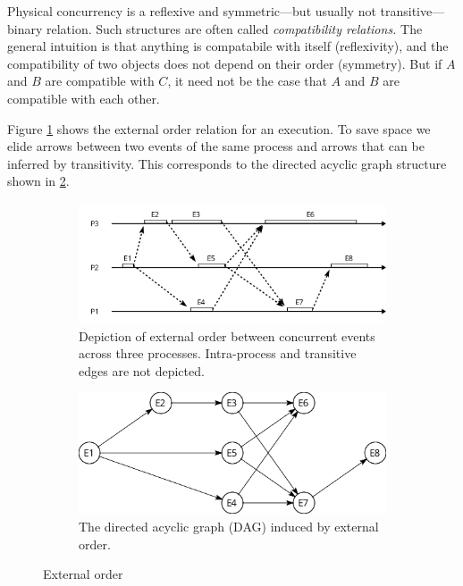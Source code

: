 \documentclass[]             %
{NASA}                       %
\theoremstyle{definition}
\begin{document}
Physical concurrency is a reflexive and symmetric---but usually not
transitive--- binary relation. Such structures are often called
\emph{compatibility relations.} The general intuition is that anything
is compatabile with itself (reflexivity), and the compatibility of two
objects does not depend on their order (symmetry). But if \(A\) and
\(B\) are compatible with \(C\), it need not be the case that \(A\) and
\(B\) are compatible with each other.

Figure \ref{fig:externalorderexec} shows the external order relation for
an execution. To save space we elide arrows between two events of the
same process and arrows that can be inferred by transitivity. This
corresponds to the directed acyclic graph structure shown in
\ref{fig:externalorderdag}.

\begin{figure}
     \begin{subfigure}[a]{1\textwidth}
         \center
         \includegraphics[scale=0.4]{images/externalorder.png}
         \caption{Depiction of external order between concurrent events across three processes. Intra-process and transitive edges are not depicted.}
         \label{fig:externalorderexec}
     \end{subfigure}
     \begin{subfigure}[b]{1\textwidth}
         \center
         \includegraphics[scale=0.25]{images/partialorder.png}
         \caption{The directed acyclic graph (DAG) induced by external order.}
         \label{fig:externalorderdag}
     \end{subfigure}
     \caption{External order}
     \label{fig:externalorder}
\end{figure}
\end{document}
